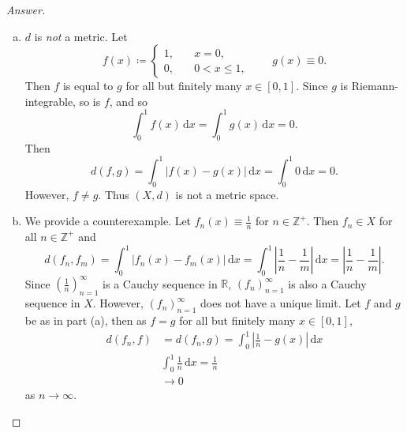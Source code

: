 \documentclass[12pt]{article}
\newcommand{\z}{\mathbb{Z}}
\newcommand{\real}{\mathbb{R}}
\newcommand{\ita}[1]{\textit{#1}}
\newcommand\paren[1]{\left( #1 \right)}
\newcommand{\abs}[1]{\left | #1 \right |}
\renewcommand{\i}[4]{\int_{#1}^{#2} {#3} \, \mathrm{d} {#4} }
\theoremstyle{definition}
\begin{document}
\begin{proof}[Answer]
    \noindent 
    \begin{enumerate}[(a)]
        \item $d$ is \ita{not} a metric. Let 
        \[
            f(x) \coloneqq 
            \begin{cases}
                    1 , & \quad x = 0 , \\ 
                    0 , & \quad 0 < x \leq 1 , 
            \end{cases}
            \qquad 
            g(x) \equiv 0 . 
        \]
        Then $f$ is equal to $g$ for all but finitely many $x \in [0,1]$. Since $g$ is Riemann-integrable, so is $f$, and so 
        \[
            \i{0}{1}{f(x)}{x} = \i{0}{1}{g(x)}{x} = 0 . 
        \]
        Then 
        \[
            d(f,g) = \i{0}{1}{\abs{f(x)-g(x)}}{x} = \i{0}{1}{0}{x} = 0 .
        \]
        However, $f \neq g$. Thus $(X,d)$ is not a metric space. 
        \item We provide a counterexample. Let $f_n(x) \equiv \frac{1}{n}$ for $n \in \z^+$. Then $f_n \in X$ for all $n \in \z^+$ and 
        \[
            d \paren{ f_n , f_m } = \i{0}{1}{ \abs{ f_n(x) - f_m(x) } }{x} = \i{0}{1}{ \abs{ \frac{1}{n} - \frac{1}{m} } }{x} = \abs{ \frac{1}{n} - \frac{1}{m} } .
        \]
        Since $\paren{ \frac{1}{n} }_{n = 1}^{\infty}$ is a Cauchy sequence in $\real$, $\paren{ f_n }_{n = 1}^{\infty}$ is also a Cauchy sequence in $X$. However, $\paren{ f_n }_{n = 1}^{\infty}$ does not have a unique limit. Let $f$ and $g$ be as in part (a), then as $f = g$ for all but finitely many $x \in [0,1]$, 
        \begin{align*}
            d \paren{ f_n , f } & = d \paren{ f_n , g } = \i{0}{1}{ \abs{ \frac{1}{n} - g(x) } }{x} \\ 
            & \i{0}{1}{ \frac{1}{n} }{x}=  \frac{1}{n} \\ 
            & \to 0
        \end{align*}
        as $n \to \infty$. 
    \end{enumerate}
\end{proof}
\end{document}
